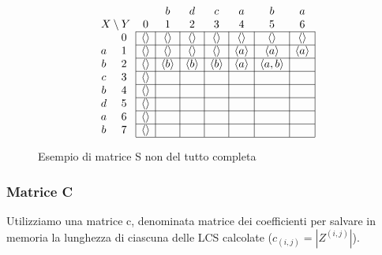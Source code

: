 \begin{figure}[h]
    \[
    \begin{array}{cc|c|c|c|c|c|c|c|}
    \multicolumn{2}{c}{} & \multicolumn{1}{c}{} & \multicolumn{1}{c}{b} & \multicolumn{1}{c}{d} & \multicolumn{1}{c}{c} & \multicolumn{1}{c}{a} & \multicolumn{1}{c}{b} & \multicolumn{1}{c}{a} \\
    \multicolumn{2}{c}{X \setminus Y} & \multicolumn{1}{c}{0} & \multicolumn{1}{c}{1} & \multicolumn{1}{c}{2} & \multicolumn{1}{c}{3} & \multicolumn{1}{c}{4} & \multicolumn{1}{c}{5} & \multicolumn{1}{c}{6} \\
    \cline{3-9}
      & 0 & \langle \rangle & \langle \rangle & \langle \rangle & \langle \rangle & \langle \rangle & \langle \rangle & \langle \rangle \\
    \cline{3-9}
    a & 1 & \langle \rangle & \langle \rangle & \langle \rangle & \langle \rangle & \langle a \rangle & \langle a \rangle & \langle a \rangle \\
    \cline{3-9}
    b & 2 & \langle \rangle & \langle b \rangle & \langle b \rangle & \langle b \rangle & \langle a \rangle & \langle a,b \rangle & \\
    \cline{3-9}
    c & 3 & \langle \rangle & & & & & & \\
    \cline{3-9}
    b & 4 & \langle \rangle & & & & & & \\
    \cline{3-9}
    d & 5 & \langle \rangle & & & & & & \\
    \cline{3-9}
    a & 6 & \langle \rangle & & & & & & \\
    \cline{3-9}
    b & 7 & \langle \rangle & & & & & & \\
    \cline{3-9}
    \end{array}
    \]

    \caption{Esempio di matrice S non del tutto completa}
\end{figure}
\subsubsection{Matrice C}
Utilizziamo una matrice c, denominata matrice dei coefficienti per salvare in memoria la lunghezza di ciascuna delle LCS calcolate ($c_{(i,j)} = |Z^{(i,j)}|$).


